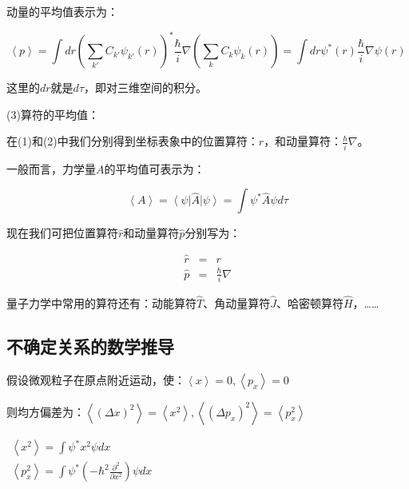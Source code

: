 动量的平均值表示为：

\begin{equation}
\left\langle p \right\rangle = \int dr \left( \sum\limits_{k'} C_{k'} \psi_{k'}(r) \right)^* \frac{\hbar}{i}\nabla \left( \sum\limits_k C_k \psi_k (r) \right) = \int dr \psi^*(r) \frac{\hbar}{i}\nabla \psi(r)
\end{equation}

这里的$dr$就是$d \tau$，即对三维空间的积分。

(3)算符的平均值：

在(1)和(2)中我们分别得到坐标表象中的位置算符：$r$，和动量算符：$\frac{\hbar }{i}\nabla$。

一般而言，力学量$A$的平均值可表示为：

\begin{center}
\begin{equation}\label{mean of A}
   \left\langle A \right\rangle  = \left\langle \psi  \right|\hat A\left| \psi  \right\rangle  = \int {\psi ^* \hat A\psi d\tau }
\end{equation}
\end{center}

现在我们可把位置算符$\hat r$和动量算符$\hat p$分别写为：

\begin{eqnarray}
\hat r & = & r \\
\hat p & = & \frac{\hbar}{i }\nabla
\end{eqnarray}

量子力学中常用的算符还有：动能算符$\hat T$、角动量算符$\hat J$、哈密顿算符$\hat H$，……

\subsection{不确定关系的数学推导}


假设微观粒子在原点附近运动，使：$\left\langle x \right\rangle  = 0,\left\langle {p_x } \right\rangle  = 0$


则均方偏差为：$\left\langle {\left( {\Delta x} \right)^2 } \right\rangle  = \left\langle {x^2 } \right\rangle ,\left\langle {\left( {\Delta p_x } \right)^2 } \right\rangle  = \left\langle {p_x ^2 } \right\rangle $

\begin{center}
$\begin{array}{l}
 \left\langle {x^2 } \right\rangle  = \int {\psi ^* x^2 \psi dx}  \\
 \left\langle {p_x ^2 } \right\rangle  = \int {\psi ^* \left( { - \hbar ^2 \frac{{\partial ^2 }}{{\partial x^2 }}} \right)\psi dx}  \\
 \end{array}$
\end{center}

